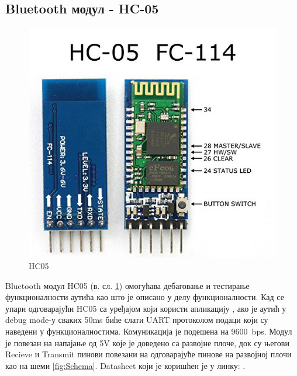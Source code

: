 \subsection{Bluetooth модул - HC-05}
	\begin{figure}[htb!]
		\begin{center}
			\includegraphics[scale=0.6]{pictures/Bluetooth}
			\caption{HC05} \label{fig:HC05}
		\end{center}
	\end{figure}
	Bluetooth модул HC05 (в. сл. \ref{fig:HC05}) омогућава дебаговање и тестирање функционалности аутића као што је описано у делу функционалности. Кад се упари одговарајући HC05 са уређајом који користи апликацију \cite{BluetoothTerminal}, ако је аутић у debug mode-у сваких 50ms биће слати UART протоколом подаци који су наведени у функционалностима. Комуникација је подешена на \si{9600 bps}. Модул је повезан на напајање од \si{5V} које је доведено са развојне плоче, док су његови Recieve и Transmit пинови повезани на одговарајуће пинове на развојној плочи као на шеми \ref{fig:Schema}. Datasheet који је коришћен је у линку: \cite{BluetoothModuleManual}.
	

